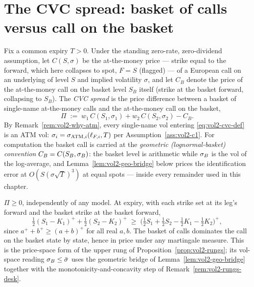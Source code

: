 \section{The CVC spread: basket of calls versus call on the basket}
\label{sec:vol2-cvc}

\begin{definition}
\label{def:vol2-cvc}
Fix a common expiry $T > 0$. Under the standing zero-rate, zero-dividend
assumption, let $C(S, \sigma)$ be the at-the-money price --- strike equal to
the forward, which here collapses to spot, $F = S$ (flagged) --- of a
European call on an underlying of level $S$ and implied volatility $\sigma$,
and let $C_B$ denote the price of the at-the-money call on the basket level
$S_B$ itself (strike at the basket forward, collapsing to $S_B$).
The \emph{CVC spread} is the price difference between a basket of
single-name at-the-money calls and the at-the-money call on the basket,
\begin{equation}
\Pi \;:=\; w_1\,C(S_1, \sigma_1) + w_2\,C(S_2, \sigma_2) - C_B.
\label{eq:vol2-cvc-def}
\end{equation}
By Remark~\ref{rem:vol2-why-atm}, every single-name vol entering
\eqref{eq:vol2-cvc-def} is an ATM vol: $\sigma_i = \sigma_{\mathrm{ATM},i}(\ell_{F,i},T)$
per Assumption~\ref{ass:vol2-c1}. For computation the basket call is
carried at the \emph{geometric (lognormal-basket) convention}
$C_B = C(S_B, \sigma_B)$: the basket level is arithmetic while $\sigma_B$ is the vol
of the log-average, and Lemma~\ref{lem:vol2-geo-bridge} below prices the
identification error at $O\!\left(S(\sigma\sqrt{T})^3\right)$ at equal
spots --- inside every remainder used in this chapter.
\end{definition}

\begin{proposition}
\label{prop:vol2-cvc-modelfree}
$\Pi \ge 0$, independently of any model. At expiry, with each strike set at
its leg's forward and the basket strike at the basket forward,
\[
\tfrac12(S_1 - K_1)^{+} + \tfrac12(S_2 - K_2)^{+}
\;\ge\;
\bigl(\tfrac12 S_1 + \tfrac12 S_2 - \tfrac12 K_1 - \tfrac12 K_2\bigr)^{+},
\]
since $a^{+} + b^{+} \ge (a+b)^{+}$ for all real $a, b$. The basket of calls
dominates the call on the basket state by state, hence in price under any
martingale measure. This is the price-space form of the upper rung of
Proposition~\ref{prop:vol2-rungs}; its vol-space reading $\sigma_B \le \bar\sigma$
uses the geometric bridge of Lemma~\ref{lem:vol2-geo-bridge} together with
the monotonicity-and-concavity step of Remark~\ref{rem:vol2-rungs-desk}.
\end{proposition}

